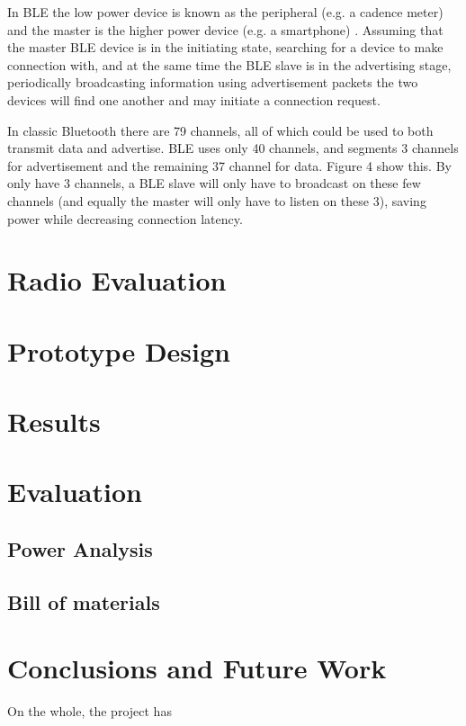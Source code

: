 \documentclass[]{article}
\begin{document}
In BLE the low power device is known as the peripheral (e.g. a cadence meter) and the master is the higher power device (e.g. a smartphone) . Assuming that the master BLE device is in the initiating state, searching for a device to make connection with, and at the same time the BLE slave is in the advertising stage, periodically broadcasting information using advertisement packets the two devices will find one another and may initiate a connection request.

In classic Bluetooth there are 79 channels, all of which could be used to both transmit data and advertise. BLE uses only 40 channels, and segments 3 channels for advertisement and the remaining 37 channel for data. Figure 4 show this. By only have 3 channels, a BLE slave will only have to broadcast on these few channels (and equally the master will only have to listen on these 3), saving power while decreasing connection latency. 

\section{Radio Evaluation}

\section{Prototype Design}

\section{Results}

\section{Evaluation}

\subsection{Power Analysis}

\subsection{Bill of materials}

\section{Conclusions and Future Work}
On the whole, the project has 
\end{document}
